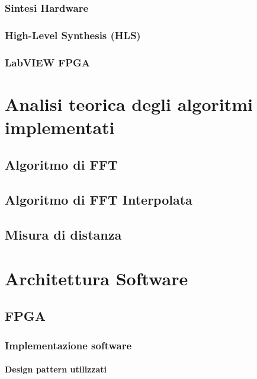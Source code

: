 		\subsubsection{Sintesi Hardware}
		
		\subsubsection{High-Level Synthesis (HLS)}
		
		\subsubsection{LabVIEW FPGA}
		
\section{Analisi teorica degli algoritmi implementati}

	\subsection{Algoritmo di FFT}
		
	\subsection{Algoritmo di FFT Interpolata}
		
	\subsection{Misura di distanza}
	
\section{Architettura Software}

	\subsection{FPGA}
	
		\subsubsection{Implementazione software}
		
			\paragraph{Design pattern utilizzati}
		

